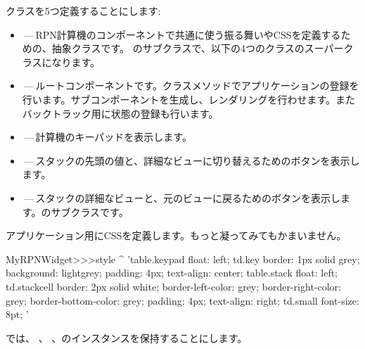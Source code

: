 \documentclass[a4paper,10pt,twoside]{book}
\begin{document}
クラスを5つ定義することにします:
\begin{itemize}
  \item {}\,---\,RPN計算機のコンポーネントで共通に使う振る舞いやCSSを定義するための、抽象クラスです。  のサブクラスで、以下の4つのクラスのスーパークラスになります。
  
  \item {}\,---\,ルートコンポーネントです。クラスメソッドでアプリケーションの登録を行います。サブコンポーネントを生成し、レンダリングを行わせます。またバックトラック用に状態の登録も行います。
  
  
  \item {}\,---\,計算機のキーパッドを表示します。
  \item {}\,---\,スタックの先頭の値と、詳細なビューに切り替えるためのボタンを表示します。
  \item {}\,---\,スタックの詳細なビューと、元のビューに戻るためのボタンを表示します。のサブクラスです。

\end{itemize}


アプリケーション用にCSSを定義します。もっと凝ってみてもかまいません。
\begin{code}{}
MyRPNWidget>>>style
	^ 'table.keypad { float: left; }
td.key {
	border: 1px solid grey;
	background: lightgrey;
	padding: 4px;
	text-align: center;
}
table.stack { float: left; }
td.stackcell {
	border: 2px solid white;
	border-left-color: grey;
	border-right-color: grey;
	border-bottom-color: grey;
	padding: 4px;
	text-align: right;
}
td.small { font-size: 8pt; }'
\end{code}


 では、 、 、のインスタンスを保持することにします。

\end{document}
